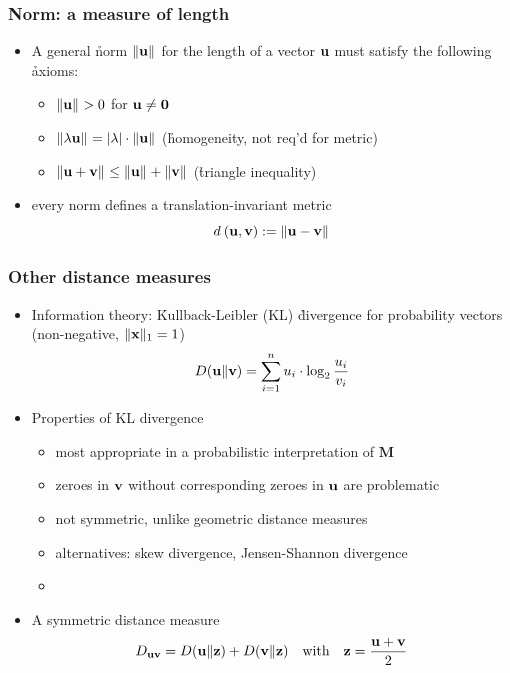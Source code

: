 \documentclass[t]{beamer} %
\begin{document}
\begin{frame}
  \frametitle{Norm: a measure of length}

  \begin{itemize}
  \item A general \h{norm} $\norm{\vu}$ for the length of a vector $\vu$ must
    satisfy the following \h{axioms}:
    \begin{itemize}
    \item $\norm{\vu} > 0$ for $\vu \neq \vnull$
    \item $\norm{\lambda\vu} = \abs{\lambda}\cdot \norm{\vu}$
      (\h{homogeneity}, not req'd for metric)
    \item $\norm{\vu + \vv} \leq \norm{\vu} + \norm{\vv}$
      (\h{triangle inequality})
    \end{itemize}
    \pause\gap
  \item every norm defines a translation-invariant metric
    \[ \dist{\vu}{\vv} \coloneq \norm{\vu - \vv} \]
  \end{itemize}
\end{frame}

\begin{frame}
  \frametitle{Other distance measures}
  
  \begin{itemize}
  \item Information theory: \h{Kullback-Leibler} (KL) \h{divergence} for probability vectors (non-negative, $\norm[1]{\vx} = 1$)
    \[
    \KL{\vu}{\vv} = \sum_{i=1}^n u_i \cdot \log_2 \frac{u_i}{v_i}
    \]
    \pause
  \item Properties of KL divergence
    \begin{itemize}
    \item most appropriate in a probabilistic interpretation of $\mathbf{M}$
    \item zeroes in $\vv$ without corresponding zeroes in $\vu$ are problematic
    \item not symmetric, unlike geometric distance measures
    \item alternatives: skew divergence, Jensen-Shannon divergence
    \item[]
    \end{itemize}
    \pause
  \item A symmetric distance measure \citep{Endres:Schindelin:03}
    \[
    D_{\vu\vv} = \KL{\vu}{\vz} + \KL{\vv}{\vz} \quad \text{with} \quad \vz = \frac{\vu + \vv}{2}
    \]
  \end{itemize}
\end{frame}
\end{document}
